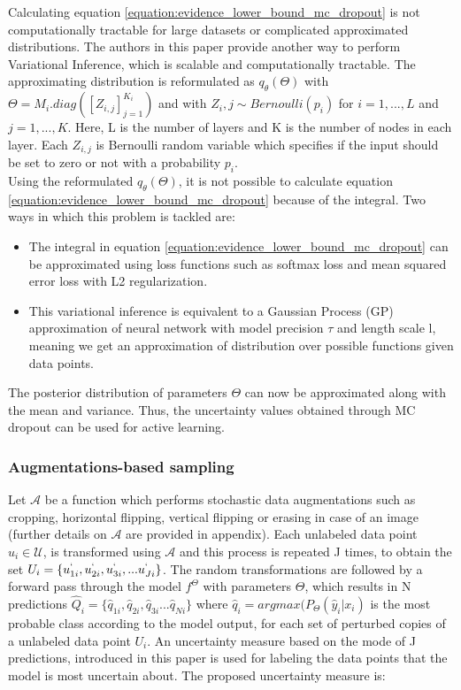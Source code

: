 Calculating equation \ref{equation:evidence_lower_bound_mc_dropout} is not computationally tractable for large datasets or complicated approximated distributions. The authors in this paper provide another way to perform Variational Inference, which is scalable and computationally tractable. The approximating distribution is reformulated as $q_{\theta}(\Theta)$ with $\Theta = M_i . diag([Z_{i, j}]_{j=1}^{K_i})$ and with $Z_i,j \sim Bernoulli(p_i)$ for $i = 1, ...,L$ and $j = 1, ...,K$. Here, L is the number of layers and K is the number of nodes in each layer. Each $Z_{i,j}$ is Bernoulli random variable which specifies if the input should be set to zero or not with a probability $p_i$. \\
Using the reformulated $q_{\theta}(\Theta)$, it is not possible to calculate equation \ref{equation:evidence_lower_bound_mc_dropout} because of the integral. Two ways in which this problem is tackled are:
\begin{itemize}
  \setlength\itemsep{0em}
  \item The integral in equation \ref{equation:evidence_lower_bound_mc_dropout} can be approximated using loss functions such as softmax loss and mean squared error loss with L2 regularization.
  \item This variational inference is equivalent to a Gaussian Process (GP) approximation of neural network with model precision $\tau$ and length scale l, meaning we get an approximation of distribution over possible functions given data points.
\end{itemize}
The posterior distribution of parameters $\Theta$ can now be approximated along with the mean and variance. Thus, the uncertainty values obtained through MC dropout can be used for active learning.

\subsubsection{Augmentations-based sampling\cite{sadafi2019}}
Let $\mathcal{A}$ be a function which performs stochastic data augmentations such as cropping, horizontal flipping, vertical flipping or erasing in case of an image (further details on $\mathcal{A}$ are provided in appendix). Each unlabeled data point $u_i\in\mathcal{U}$, is transformed using $\mathcal{A}$ and this process is repeated J times, to obtain the set $U_i = \{u_{1i}^{`}, u_{2i}^{`}, u^{`}_{3i}, ... u_{Ji}^{`}\}$. The random transformations are followed by a forward pass through the model $f^\Theta$ with parameters $\Theta$, which results in N predictions $\hat{Q}_i = \{\hat{q}_{1i}, \hat{q}_{2i}, \hat{q}_{3i} ... \hat{q}_{Ni}\}$ where $\hat{q}_i = argmax(P_\Theta(\hat{y}_i|x_i)$ is the most probable class according to the model output, for each set of perturbed copies of a unlabeled data point $U_i$. An uncertainty measure based on the mode of J predictions, introduced in this paper\cite{sadafi2019} is used for labeling the data points that the model is most uncertain about. The proposed uncertainty measure is:

